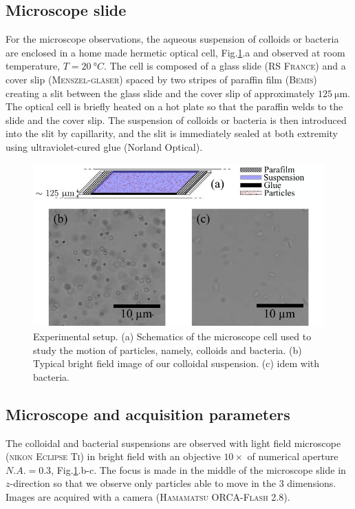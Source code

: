 \documentclass[prb,reprint,amsmath,amssymb]{revtex4-1}
\newcommand{\tg}[1]{{\color{magenta}#1}} %
\begin{document}
\subsection{Microscope slide}
For the microscope observations, the aqueous suspension of colloids or bacteria are enclosed in a home made hermetic optical cell, Fig.\ref{fig:Slide}.a and observed at room temperature, $T=\SI{20}{\degree C}$. The cell is composed of a  glass slide (\textsc{RS France}) and a cover slip (\textsc{Menszel-gl\"aser}) spaced by two stripes of paraffin film (\textsc{Bemis}) \tg{creating a slit between the glass slide and the cover slip of approximately $\SI{125}{\micro\meter}$}. The optical cell is briefly heated on a hot plate so that the paraffin welds to the slide and the cover slip. The suspension of colloids or bacteria is then introduced into the slit by capillarity, and the slit is immediately sealed at both extremity using ultraviolet-cured glue (Norland Optical).

\begin{figure}
\includegraphics[width=\linewidth]{Lamelle_Photos.pdf}
\caption{Experimental setup. (a) Schematics of the microscope cell used to study the motion of particles, namely, colloids and bacteria. (b) Typical bright field image of our colloidal suspension. (c) idem with bacteria.}
\label{fig:Slide}
\end{figure}

\subsection{Microscope and acquisition parameters}

The colloidal and bacterial suspensions are observed with light field microscope\cite{Mignard2015} (\textsc{nikon Eclipse Ti}) in \tg{bright field} with an objective $10 \times$ of numerical aperture $N.A. = 0.3$, Fig.\ref{fig:Slide}.b-c. The focus is made in the middle of the microscope slide in $z$-direction \tg{so that we observe only particles able to move in the 3 dimensions}. Images are acquired with a camera (\textsc{Hamamatsu ORCA-Flash 2.8}).
\end{document}
